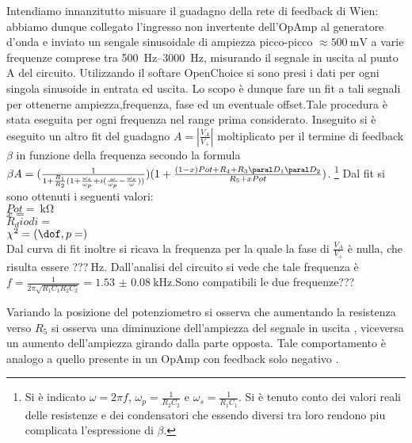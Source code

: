 Intendiamo innanzitutto misuare il guadagno della rete di feedback di Wien: abbiamo dunque collegato l'ingresso
non invertente dell'OpAmp al generatore d'onda e inviato un sengale sinusoidale di ampiezza picco-picco $\approx \SI{500}{\mV}$
a varie frequenze comprese tra \SIrange[range-phrase = \text{ e }]{500}{3000}{\Hz},
misurando il segnale in uscita al punto A del circuito. Utilizzando il softare OpenChoice si sono presi i dati per ogni singola sinusoide in entrata ed uscita. Lo scopo è dunque fare un fit a tali segnali per ottenerne ampiezza,frequenza, fase ed un eventuale offset.Tale procedura è stata eseguita per ogni frequenza nel range prima considerato.
Inseguito si è eseguito un altro fit del guadagno $A=\left | \frac{V_A}{V_+} \right | $ moltiplicato per il termine di feedback $\beta$ in funzione della frequenza secondo la formula $\beta A= (\frac{1}{1+\frac{R_1}{R_2}(1+\frac{\omega_s}{\omega_p}+i(\frac{\omega}{\omega_p}-\frac{\omega_s}{\omega} ))})(1 + \frac{(1-x)Pot+R_4+R_3 \paral D_1 \paral D_2}{R_5+xPot})$. 
\footnote{Si è indicato $\omega=2 \pi f$, $\omega_p= \frac{1}{R_2C_2}$ e $\omega_s=\frac{1}{R_1C_1}$. Si è tenuto conto dei valori reali delle resistenze e dei condensatori che essendo diversi tra loro rendono piu complicata l'espressione di $\beta$. }
Dal fit si sono ottenuti i seguenti valori:\\
$Pot= \SI{}{\kohm}$\\
$x= \SI{}{}$\\ 
$R_diodi= \SI{}{}$\\
$\chi^2 =  ( \dof, p = )$\\
Dal curva di fit inoltre si ricava la frequenza per la quale la fase di $\frac{V_A}{V_+}$ è nulla, che risulta essere ???$\SI{}{\Hz}$.  Dall'analisi del circuito si vede che tale frequenza è $f=\frac{1}{2 \pi \sqrt{R_1C_1R_2C_2}}= \SI{1.53(8)}{\kHz}$.Sono compatibili le due frequenze???

Variando la posizione del potenziometro si osserva che aumentando la resistenza verso $R_5$ si osserva una diminuzione dell'ampiezza del segnale in uscita , viceversa un aumento dell'ampiezza girando dalla parte opposta. Tale comportamento è analogo a quello presente in un OpAmp con feedback solo negativo .
